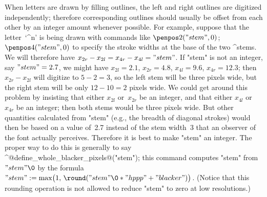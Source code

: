 \danger When letters are drawn by filling outlines, the left and right
outlines are digitized independently; therefore corresponding outlines
should usually be offset from each other by an integer amount whenever
possible. For example, suppose that the letter~`^{n}' is being drawn
with commands like
\begindisplay
$\penpos2("stem",0)$; \ $\penpos4("stem",0)$
\enddisplay
to specify the stroke widths at the base of the two ^{stems}.
We will therefore have $x_{2r}-x_{2l}=x_{4r}-x_{4l}="stem"$. If
"stem" is not an integer, say $"stem"=2.7$, we might have
$x_{2l}=2.1$, $x_{2r}=4.8$, $x_{4l}=9.6$, $x_{4r}=12.3$;
then $x_{2r}-x_{2l}$ will digitize to $5-2=3$, so the left stem
will be three pixels wide, but the right stem will be only
$12-10=2$ pixels wide. We could get around this problem by
insisting that either $x_{2l}$ or~$x_{2r}$ be an integer,
and that either $x_{4l}$ or~$x_{4r}$ be an integer; then both stems
would be three pixels wide. But other quantities calculated from "stem"
(e.g., the breadth of diagonal strokes) would then be based on a
value of~2.7 instead of the stem width~3 that an observer of the
font actually perceives. Therefore it is best to make "stem" an integer.
The proper way to do this is generally to say
\begindisplay
^@define\_whole\_blacker\_pixels@("stem");
\enddisplay
this command computes "stem" from $"stem"\0$ by the formula
\begindisplay
$"stem":=\max\bigl(1,\,\round("stem"\0\ast"hppp"+"blacker")\bigr)$.
\enddisplay
(Notice that this rounding operation is not allowed to reduce "stem"
to zero at low resolutions.)

